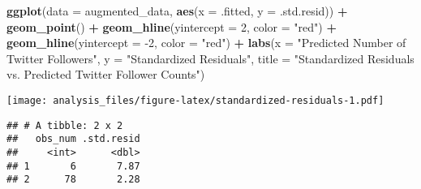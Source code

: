 \documentclass[]{article}
\newenvironment{Shaded}{\begin{snugshade}}{\end{snugshade}}
\newcommand{\DataTypeTok}[1]{\textcolor[rgb]{0.13,0.29,0.53}{#1}}
\newcommand{\DecValTok}[1]{\textcolor[rgb]{0.00,0.00,0.81}{#1}}
\newcommand{\KeywordTok}[1]{\textcolor[rgb]{0.13,0.29,0.53}{\textbf{#1}}}
\newcommand{\NormalTok}[1]{#1}
\newcommand{\OperatorTok}[1]{\textcolor[rgb]{0.81,0.36,0.00}{\textbf{#1}}}
\newcommand{\StringTok}[1]{\textcolor[rgb]{0.31,0.60,0.02}{#1}}
\begin{document}
\begin{Shaded}
\begin{Highlighting}[]
\KeywordTok{ggplot}\NormalTok{(}\DataTypeTok{data =}\NormalTok{ augmented_data, }\KeywordTok{aes}\NormalTok{(}\DataTypeTok{x =}\NormalTok{ .fitted, }\DataTypeTok{y =}\NormalTok{ .std.resid)) }\OperatorTok{+}\StringTok{ }
\StringTok{  }\KeywordTok{geom_point}\NormalTok{() }\OperatorTok{+}\StringTok{ }
\StringTok{  }\KeywordTok{geom_hline}\NormalTok{(}\DataTypeTok{yintercept =} \DecValTok{2}\NormalTok{, }\DataTypeTok{color =} \StringTok{"red"}\NormalTok{) }\OperatorTok{+}
\StringTok{  }\KeywordTok{geom_hline}\NormalTok{(}\DataTypeTok{yintercept =} \DecValTok{-2}\NormalTok{, }\DataTypeTok{color =} \StringTok{"red"}\NormalTok{) }\OperatorTok{+}\StringTok{ }
\StringTok{  }\KeywordTok{labs}\NormalTok{(}\DataTypeTok{x =} \StringTok{"Predicted Number of Twitter Followers"}\NormalTok{,}
       \DataTypeTok{y =} \StringTok{"Standardized Residuals"}\NormalTok{,}
       \DataTypeTok{title =} \StringTok{"Standardized Residuals vs. Predicted Twitter Follower Counts"}\NormalTok{)}
\end{Highlighting}
\end{Shaded}

\texttt{[image: analysis\_files/figure-latex/standardized-residuals-1.pdf]}

\begin{Shaded}
\end{Shaded}

\begin{verbatim}
## # A tibble: 2 x 2
##   obs_num .std.resid
##     <int>      <dbl>
## 1       6       7.87
## 2      78       2.28
\end{verbatim}

\begin{Shaded}
\end{Shaded}
\end{document}
